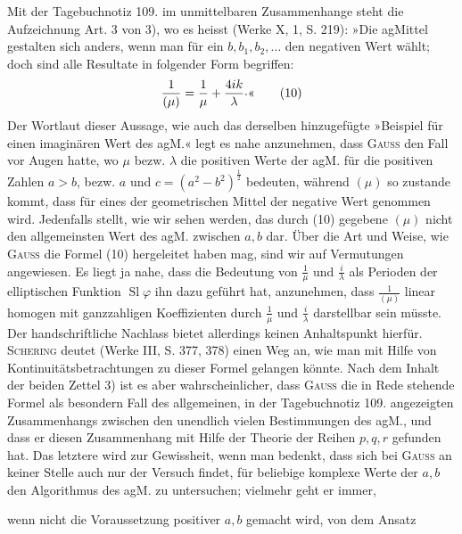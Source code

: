 Mit der Tagebuchnotiz 109. im unmittelbaren Zusammenhange steht die
Aufzeichnung Art. 3 von 3), wo es heisst (Werke X, 1, S. 219): »Die agMittel
gestalten sich anders, wenn man für ein \(b,b_1,b_2,\ldots\) den negativen Wert wählt;
doch sind alle Resultate in folgender Form begriffen:
\begingroup\makeatletter\tagsleft@true\let\veqno\leqno\makeatother
\begin{equation*}
\frac1{(\mu)}=\frac1\mu+\frac{4ik}\lambda\text{\raisebox{.3ex}{.}«}\tag{10}
\end{equation*}
\endgroup
\noindent Der Wortlaut dieser Aussage, wie auch das derselben hinzugefügte »Beispiel
für einen imaginären Wert des agM.« legt es nahe anzunehmen, dass \textsc{Gauss}
den Fall vor Augen hatte, wo \(\mu\) bezw. \(\lambda\) die positiven Werte der agM. für
die positiven Zahlen \(a>b\), bezw. \(a\) und \(c=(a^2-b^2)^{\frac12}\) bedeuten, während \((\mu)\)
so zustande kommt, dass für eines der geometrischen Mittel der negative Wert
genommen wird. Jedenfalls stellt, wie wir sehen werden, das durch (10) gegebene
\((\mu)\) nicht den allgemeinsten Wert des agM. zwischen \(a,b\) dar. Über
die Art und Weise, wie \textsc{Gauss} die Formel (10) hergeleitet haben mag, sind
wir auf Vermutungen angewiesen. Es liegt ja nahe, dass die Bedeutung von
\(\frac1\mu\) und \(\frac i\lambda\) als Perioden der elliptischen Funktion \(\operatorname{Sl}\varphi\) ihn dazu geführt hat,
anzunehmen, dass \(\frac1{(\mu)}\) linear homogen mit ganzzahligen Koeffizienten durch
\(\frac1\mu\) und \(\frac i\lambda\) darstellbar sein müsste. Der handschriftliche Nachlass bietet allerdings
keinen Anhaltspunkt hierfür. \textsc{Schering} deutet (Werke III, S. 377, 378)
einen Weg an, wie man mit Hilfe von Kontinuitätsbetrachtungen zu dieser
Formel gelangen könnte. Nach dem Inhalt der beiden Zettel 3) ist es aber
wahrscheinlicher, dass \textsc{Gauss} die in Rede stehende Formel als besondern Fall
des allgemeinen, in der Tagebuchnotiz 109. angezeigten Zusammenhangs zwischen
den unendlich vielen Bestimmungen des agM., und dass er diesen Zusammenhang
mit Hilfe der Theorie der Reihen \(p,q,r\) gefunden hat. Das
letztere wird zur Gewissheit, wenn man bedenkt, dass sich bei \textsc{Gauss} an keiner
Stelle auch nur der Versuch findet, für beliebige komplexe Werte der \(a,b\)
den Algorithmus des agM.  zu untersuchen; vielmehr geht er immer,\par
\clearpage{}
\noindent wenn nicht die Voraussetzung positiver \(a,b\) gemacht wird, von dem Ansatz

